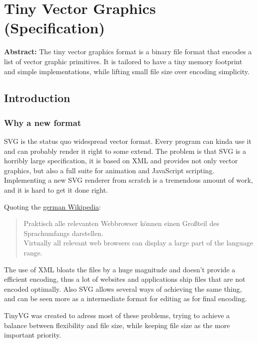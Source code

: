 \documentclass[
]{article}
\author{}
\date{}
\begin{document}
\hypertarget{tiny-vector-graphics-specification}{%
\section{Tiny Vector Graphics
(Specification)}\label{tiny-vector-graphics-specification}}

\textbf{Abstract:} The tiny vector graphics format is a binary file
format that encodes a list of vector graphic primitives. It is tailored
to have a tiny memory footprint and simple implementations, while
lifting small file size over encoding simplicity.

\hypertarget{introduction}{%
\subsection{Introduction}\label{introduction}}

\hypertarget{why-a-new-format}{%
\subsubsection{Why a new format}\label{why-a-new-format}}

SVG is the status quo widespread vector format. Every program can kinda
use it and can probably render it right to some extend. The problem is
that SVG is a horribly large specification, it is based on XML and
provides not only vector graphics, but also a full suite for animation
and JavaScript scripting. Implementing a new SVG renderer from scratch
is a tremendous amount of work, and it is hard to get it done right.

Quoting the
\href{https://de.wikipedia.org/wiki/Scalable_Vector_Graphics}{german
Wikipedia}:

\begin{quote}
Praktisch alle relevanten Webbrowser können einen Großteil des
Sprachumfangs darstellen.\\
Virtually all relevant web browsers can display a large part of the
language range.
\end{quote}

The use of XML bloats the files by a huge magnitude and doesn't provide
a efficient encoding, thus a lot of websites and applications ship files
that are not encoded optimally. Also SVG allows several ways of
achieving the same thing, and can be seen more as a intermediate format
for editing as for final encoding.

TinyVG was created to adress most of these problems, trying to achieve a
balance between flexibility and file size, while keeping file size as
the more important priority.
\end{document}
